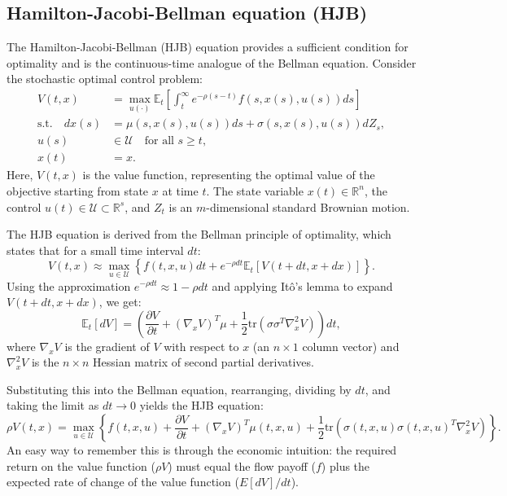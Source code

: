 \documentclass[../../lecture_notes.tex]{subfiles}
\begin{document}
\subsection{Hamilton-Jacobi-Bellman equation (HJB)}

The Hamilton-Jacobi-Bellman (HJB) equation provides a sufficient condition for optimality and is the continuous-time analogue of the Bellman equation.
Consider the stochastic optimal control problem:
\begin{align*}
  V(t,x) &= \max_{u(\cdot)} \mathbb{E}_{t} \left[ \int_{t}^{\infty} e^{-\rho (s-t)} f(s, x(s), u(s)) ds \right] \\
  \text{s.t.} \quad dx(s) &= \mu(s, x(s), u(s))ds + \sigma(s, x(s), u(s))dZ_{s}, \\
  u(s) &\in \mathcal{U} \quad \text{for all } s \ge t, \\
  x(t) &= x.
\end{align*}
Here, \(V(t,x)\) is the value function, representing the optimal value of the objective starting from state \(x\) at time \(t\).
The state variable \(x(t) \in \mathbb{R}^n\), the control \(u(t) \in \mathcal{U} \subset \mathbb{R}^s\), and \(Z_t\) is an \(m\)-dimensional standard Brownian motion.

The HJB equation is derived from the Bellman principle of optimality, which states that for a small time interval \(dt\):
\begin{equation*}
  V(t,x) \approx \max_{u \in \mathcal{U}} \left\{ f(t,x,u)dt + e^{-\rho dt} \mathbb{E}_t [V(t+dt, x+dx)] \right\}.
\end{equation*}
Using the approximation \(e^{-\rho dt} \approx 1 - \rho dt\) and applying Itô's lemma to expand \(V(t+dt, x+dx)\), we get:
\begin{equation*}
  \mathbb{E}_t[dV] = \left( \frac{\partial V}{\partial t} + (\nabla_x V)^T \mu + \frac{1}{2} \text{tr}\left( \sigma \sigma^T \nabla_x^2 V \right) \right) dt,
\end{equation*}
where \(\nabla_x V\) is the gradient of \(V\) with respect to \(x\) (an \(n \times 1\) column vector) and \(\nabla_x^2 V\) is the \(n \times n\) Hessian matrix of second partial derivatives.

Substituting this into the Bellman equation, rearranging, dividing by \(dt\), and taking the limit as \(dt \to 0\) yields the HJB equation:
\begin{equation}
  \rho V(t,x) = \max_{u \in \mathcal{U}} \left\{ f(t,x,u) + \frac{\partial V}{\partial t} + (\nabla_x V)^T \mu(t,x,u) + \frac{1}{2} \text{tr}\left( \sigma(t,x,u) \sigma(t,x,u)^T \nabla_x^2 V \right) \right\}.
  \label{eq:hjb}
\end{equation}
An easy way to remember this is through the economic intuition: the required return on the value function (\(\rho V\)) must equal the flow payoff (\(f\)) plus the expected rate of change of the value function (\(E[dV]/dt\)).
\end{document}
